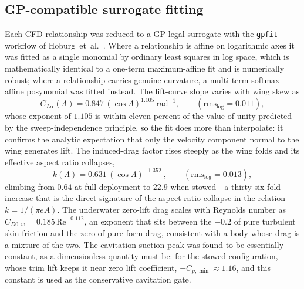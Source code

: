 \documentclass[conf]{new-aiaa}
\begin{document}
\subsection{GP-compatible surrogate fitting}
Each CFD relationship was reduced to a GP-legal surrogate with the \texttt{gpfit} workflow of Hoburg~et~al.~\cite{hoburg2016data}. Where a
relationship is affine on logarithmic axes it was fitted as a single monomial by ordinary least
squares in log space, which is mathematically identical to a one-term maximum-affine fit and is
numerically robust; where a relationship carries genuine curvature, a multi-term softmax-affine
posynomial was fitted instead. The lift-curve slope varies with wing skew as
\begin{equation}
C_{L\alpha}(\Lambda) = 0.847\,(\cos\Lambda)^{1.105}\ \text{rad}^{-1},
\qquad(\text{rms}_{\log}=0.011),
\label{eq:clalpha}
\end{equation}
whose exponent of $1.105$ is within eleven percent of the value of unity predicted by the
sweep-independence principle, so the fit does more than interpolate: it confirms the analytic
expectation that only the velocity component normal to the wing generates lift. The induced-drag
factor rises steeply as the wing folds and its effective aspect ratio collapses,
\begin{equation}
k(\Lambda) = 0.631\,(\cos\Lambda)^{-1.352}\ ,
\qquad(\text{rms}_{\log}=0.013),
\label{eq:kschedule}
\end{equation}
climbing from $0.64$ at full deployment to $22.9$ when stowed---a thirty-six-fold increase that is
the direct signature of the aspect-ratio collapse in the relation $k=1/(\pi e A)$. The underwater
zero-lift drag scales with Reynolds number as $C_{D0,w}=0.185\,\mathrm{Re}^{-0.112}$, an exponent
that sits between the $-0.2$ of pure turbulent skin friction and the zero of pure form drag,
consistent with a body whose drag is a mixture of the two. The cavitation suction peak was found to
be essentially constant, as a dimensionless quantity must be: for the stowed configuration, whose
trim lift keeps it near zero lift coefficient, $-C_{p,\min}\approx1.16$, and this constant is used as
the conservative cavitation gate.
\end{document}
